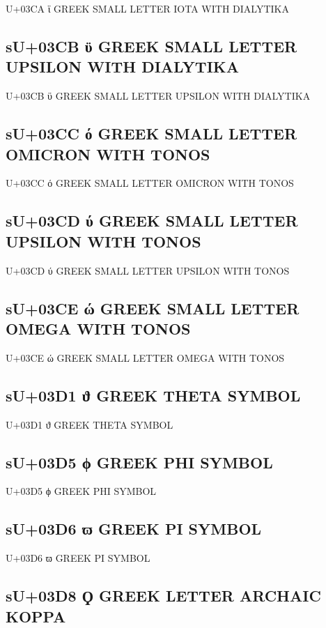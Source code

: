U+03CA ϊ GREEK SMALL LETTER IOTA WITH DIALYTIKA

\subsection{sU+03CB ϋ GREEK SMALL LETTER UPSILON WITH DIALYTIKA}

U+03CB ϋ GREEK SMALL LETTER UPSILON WITH DIALYTIKA

\subsection{sU+03CC ό GREEK SMALL LETTER OMICRON WITH TONOS}

U+03CC ό GREEK SMALL LETTER OMICRON WITH TONOS

\subsection{sU+03CD ύ GREEK SMALL LETTER UPSILON WITH TONOS}

U+03CD ύ GREEK SMALL LETTER UPSILON WITH TONOS

\subsection{sU+03CE ώ GREEK SMALL LETTER OMEGA WITH TONOS}

U+03CE ώ GREEK SMALL LETTER OMEGA WITH TONOS

\subsection{sU+03D1 ϑ GREEK THETA SYMBOL}

U+03D1 ϑ GREEK THETA SYMBOL

\subsection{sU+03D5 ϕ GREEK PHI SYMBOL}

U+03D5 ϕ GREEK PHI SYMBOL

\subsection{sU+03D6 ϖ GREEK PI SYMBOL}

U+03D6 ϖ GREEK PI SYMBOL

\subsection{sU+03D8 Ϙ GREEK LETTER ARCHAIC KOPPA}

